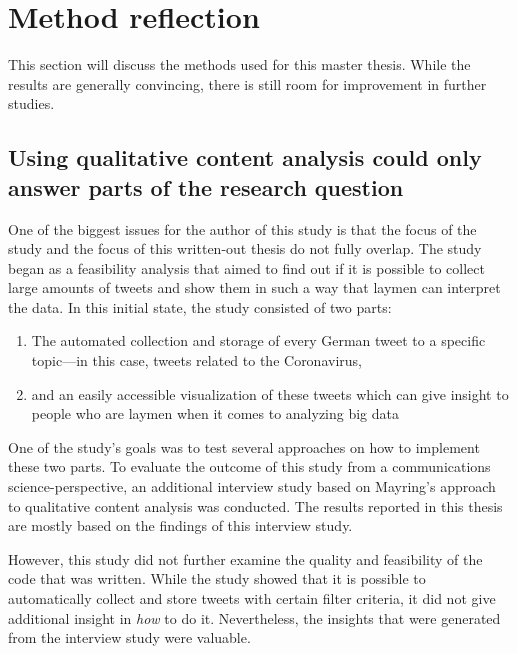 \section{Method reflection}
This section will discuss the methods used for this master thesis. While the results are generally convincing, there is still room for improvement in further studies.

\subsection*{Using qualitative content analysis could only answer parts of the research question}
One of the biggest issues for the author of this study is that the focus of the study and the focus of this written-out thesis do not fully overlap. The study began as a feasibility analysis that aimed to find out if it is possible to collect large amounts of tweets and show them in such a way that laymen can interpret the data. In this initial state, the study consisted of two parts:

\begin{enumerate}
    \item The automated collection and storage of every German tweet to a specific topic---in this case, tweets related to the Coronavirus,
    \item and an easily accessible visualization of these tweets which can give insight to people who are laymen when it comes to analyzing big data
\end{enumerate}

One of the study's goals was to test several approaches on how to implement these two parts. To evaluate the outcome of this study from a communications science-perspective, an additional interview study based on Mayring's approach to qualitative content analysis was conducted. The results reported in this thesis are mostly based on the findings of this interview study.

However, this study did not further examine the quality and feasibility of the code that was written. While the study showed that it is possible to automatically collect and store tweets with certain filter criteria, it did not give additional insight in \emph{how} to do it. Nevertheless, the insights that were generated from the interview study were valuable.

